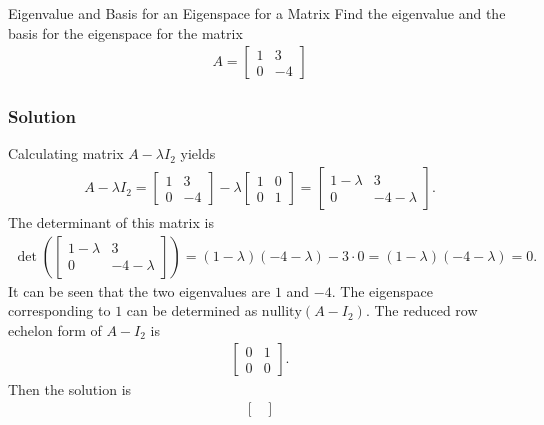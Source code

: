 \begin{example}{Eigenvalue and Basis for an Eigenspace for a Matrix}
    Find the eigenvalue and the basis for the eigenspace for the matrix
    \begin{align*}
        A=
        \begin{bmatrix}
            1 & 3\\
            0 & -4
        \end{bmatrix}
    \end{align*}
    \subsubsection{Solution}
Calculating matrix $A-\lambda I_2$ yields
    \begin{align*}
        A-\lambda I_2=
         \begin{bmatrix}
            1 & 3\\
            0 & -4
        \end{bmatrix} -\lambda
        \begin{bmatrix}
            1 & 0\\
            0 & 1
        \end{bmatrix}=
        \begin{bmatrix}
            1-\lambda & 3\\
            0 & -4-\lambda
        \end{bmatrix}.
    \end{align*}
    The determinant of this matrix is
    \begin{align*}
        \det \left(\begin{bmatrix}
            1-\lambda & 3\\
            0 & -4-\lambda
        \end{bmatrix} \right)=(1-\lambda)(-4-\lambda)-3\cdot0=(1-\lambda)(-4-\lambda)=0.
    \end{align*}
   It can be seen that the two eigenvalues are $1$ and $-4$. 
   The eigenspace corresponding to $1$ can be determined as $\text{nullity}(A-I_2)$. The reduced row echelon form of $A-I_2$ is
    \begin{align*}
            \begin{bmatrix}
                0 & 1\\
                0 & 0
            \end{bmatrix}.
    \end{align*}
    Then the solution is 
    \begin{align*}
        \begin{bmatrix}

\end{bmatrix}
\end{align*}
\end{example}
